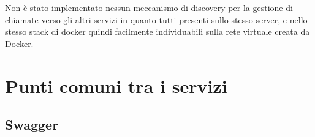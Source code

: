 Non è stato implementato nessun meccanismo di discovery per la gestione di chiamate verso gli altri servizi in quanto tutti presenti sullo stesso server, e nello stesso stack di docker
quindi facilmente individuabili sulla rete virtuale creata da Docker.


\section{Punti comuni tra i servizi}

\subsection{Swagger}